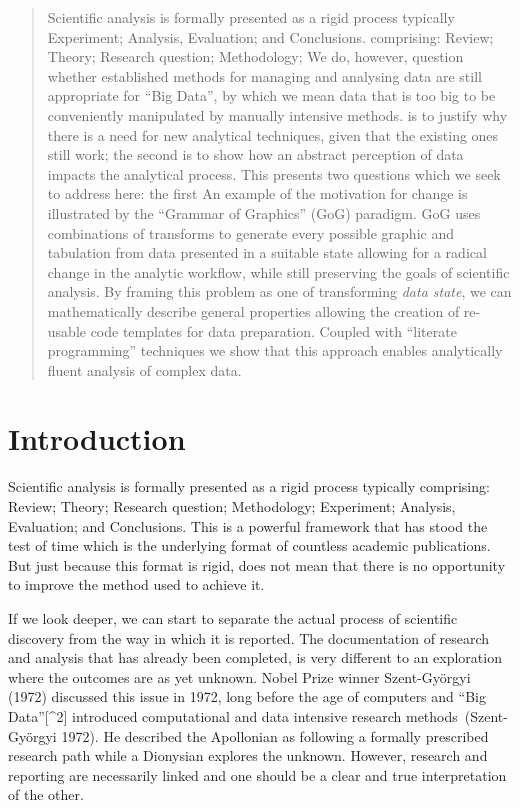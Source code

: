 \documentclass[smallextended]{svjour3}       %
\begin{document}
\begin{abstract}
Scientific analysis is formally presented as a rigid process typically
Experiment; Analysis, Evaluation; and Conclusions.
comprising: Review; Theory; Research question; Methodology;
We do, however, question whether established methods for managing and
analysing data are still appropriate for ``Big Data'', by which we mean
data that is too big to be conveniently manipulated by manually
intensive methods.
is to justify why there is a need for new analytical techniques, given
that the existing ones still work; the second is to show how an
abstract perception of data impacts the analytical process.
This presents two questions which we seek to address here: the first
An example of the motivation for change is illustrated by the ``Grammar
of Graphics'' (GoG) paradigm. GoG uses combinations of transforms to
generate every possible graphic and tabulation from data presented in
a suitable state allowing for a radical change in the analytic
workflow, while still preserving the goals of scientific analysis.
By framing this problem as one of transforming \emph{data state}, we can
mathematically describe general properties allowing the creation of
re-usable code templates for data preparation. Coupled with ``literate
programming'' techniques we show that this approach enables
analytically fluent analysis of complex data.
\\


\end{abstract}


\def\spacingset#1{\renewcommand{\baselinestretch}%
{#1}\small\normalsize} \spacingset{1}


\hypertarget{sec:introduction}{%
\section{Introduction}\label{sec:introduction}}

Scientific analysis is formally presented as a rigid process typically comprising: Review; Theory; Research question; Methodology; Experiment; Analysis, Evaluation; and Conclusions. This is a powerful framework that has stood the test of time which is the underlying format of countless academic publications. But just because this format is rigid, does not mean that there is no opportunity to improve the method used to achieve it.

If we look deeper, we can start to separate the actual process of scientific discovery from the way in which it is reported. The documentation of research and analysis that has already been completed, is very different to an exploration where the outcomes are as yet unknown. Nobel Prize winner Szent-Györgyi (1972) discussed this issue in 1972, long before the age of computers and ``Big Data''{[}\^{}2{]} introduced computational and data intensive research methods~(Szent-Györgyi 1972). He described the Apollonian as following a formally prescribed research path while a Dionysian explores the unknown. However, research and reporting are necessarily linked and one should be a clear and true interpretation of the other.
\end{document}
